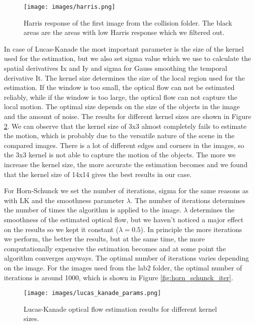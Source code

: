 \documentclass[9pt]{IEEEtran}
\begin{document}
\begin{figure}[htb]
    \centering
    \texttt{[image: images/harris.png]}
    \caption{Harris response of the first image from the collision folder. The black areas are the areas with low Harris response which we filtered out.}
    \label{fig:harris_response}
\end{figure}


In case of Lucas-Kanade the most important parameter is the size of the kernel used for the estimation, but we also set sigma value which we use to calculate the spatial derivatives Ix and Iy and sigma for Gauss smoothing the temporal derivative It.
The kernel size determines the size of the local region used for the estimation. If the window is too small, the optical flow can not be estimated reliably, while if the window is too large, the optical flow can not capture the local motion. 
The optimal size depends on the size of the objects in the image and the amount of noise. The results for different kernel sizes are shown in Figure \ref{fig:kernel_size}. We can observe that the kernel size of 3x3 almost completely fails to estimate the motion, which is probably due to the versatile nature of the scene in the compared images. There is a lot of different edges and corners in the images, so the 3x3 kernel is not able to capture the motion of the objects. 
The more we increase the kernel size, the more accurate the estimation becomes and we found that the kernel size of 14x14 gives the best results in our case.

For Horn-Schunck we set the number of iterations, sigma for the same reasons as with LK and the smoothness parameter \(\lambda\). The number of iterations determines the number of times the algorithm is applied to the image.
\(\lambda\) determines the smoothness of the estimated optical flow, but we haven't noticed a major effect on the results so we kept it constant (\(\lambda = 0.5\)). 
In principle the more iterations we perform, the better the results, but at the same time, the more computationally expensive the estimation becomes and at some point the algorithm converges anyways.
The optimal number of iterations varies depending on the image. For the images used from the lab2 folder, the optimal number of iterations is around 1000, which is shown in Figure \ref{fig:horn_schunck_iter}.


 \begin{figure}[htb]
    \centering
    \texttt{[image: images/lucas\_kanade\_params.png]}
    \caption{Lucas-Kanade optical flow estimation results for different kernel sizes.}
    \label{fig:kernel_size}
\end{figure}
\end{document}
